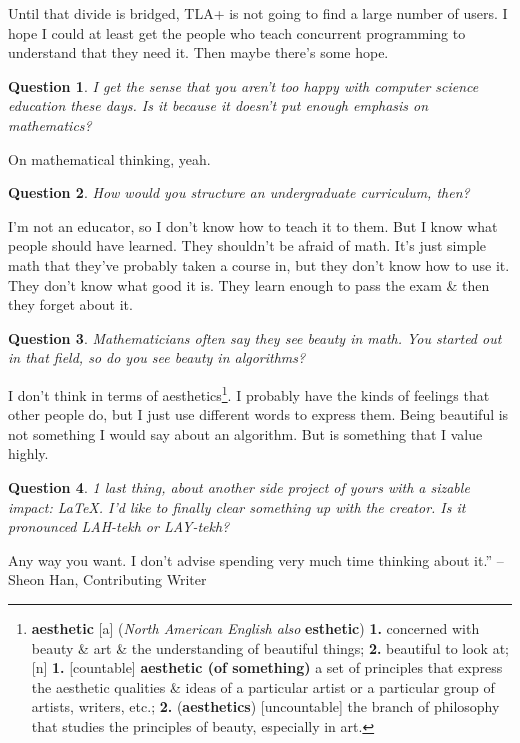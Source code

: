 \documentclass[oneside]{book}
\numberwithin{equation}{section}
\newtheorem{question}{Question}[chapter]
\begin{document}
Until that divide is bridged, TLA+ is not going to find a large number of users. I hope I could at least get the people who teach concurrent programming to understand that they need it. Then maybe there's some hope.

\begin{question}
	I get the sense that you aren't too happy with computer science education these days. Is it because it doesn't put enough emphasis on mathematics?
\end{question}
On mathematical thinking, yeah.

\begin{question}
	How would you structure an undergraduate curriculum, then?
\end{question}
I'm not an educator, so I don't know how to teach it to them. But I know what people should have learned. They shouldn't be afraid of math. It's just simple math that they've probably taken a course in, but they don't know how to use it. They don't know what good it is. They learn enough to pass the exam \& then they forget about it.

\begin{question}
	Mathematicians often say they see beauty in math. You started out in that field, so do you see beauty in algorithms?
\end{question}
I don't think in terms of aesthetics\footnote{\textbf{aesthetic} [a] (\textit{North American English also} \textbf{esthetic}) \textbf{1.} concerned with beauty \& art \& the understanding of beautiful things; \textbf{2.} beautiful to look at; [n] \textbf{1.} [countable] \textbf{aesthetic (of something)} a set of principles that express the aesthetic qualities \& ideas of a particular artist or a particular group of artists, writers, etc.; \textbf{2.} (\textbf{aesthetics}) [uncountable] the branch of philosophy that studies the principles of beauty, especially in art.}. I probably have the kinds of feelings that other people do, but I just use different words to express them. Being beautiful is not something I would say about an algorithm. But  is something that I value highly.

\begin{question}
	1 last thing, about another side project of yours with a sizable impact: \LaTeX. I'd like to finally clear something up with the creator. Is it pronounced LAH-tekh or LAY-tekh?
\end{question}
Any way you want. I don't advise spending very much time thinking about it.'' -- Sheon Han, Contributing Writer
\end{document}
